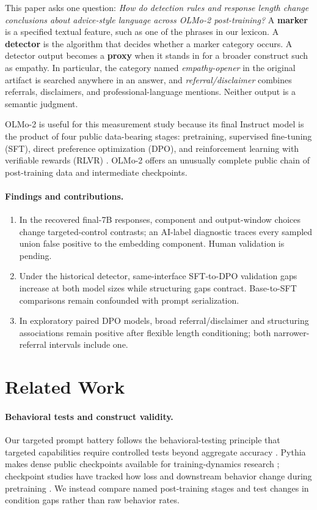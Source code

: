 \documentclass[11pt]{article}
\begin{document}
This paper asks one question: \emph{How do detection rules and response length
change conclusions about advice-style language across OLMo-2 post-training?}
A \textbf{marker} is a specified textual feature, such as one of the phrases in
our lexicon. A \textbf{detector} is the algorithm that decides whether a marker
category occurs. A detector output becomes a \textbf{proxy} when it stands in
for a broader construct such as empathy. In particular, the category named
\emph{empathy-opener} in the original artifact is searched anywhere in an
answer, and \emph{referral/disclaimer} combines referrals, disclaimers, and
professional-language mentions. Neither output is a semantic judgment.

OLMo-2 is useful for this measurement study because its final Instruct model is
the product of four public data-bearing stages:
pretraining, supervised fine-tuning (SFT), direct preference optimization
(DPO), and reinforcement learning with verifiable rewards (RLVR)
\citep{olmo2025olmo2}. OLMo-2 offers an unusually complete public chain of
post-training data and intermediate checkpoints.

\newpage
\paragraph{Findings and contributions.}
\begin{enumerate}\itemsep2pt
\item In the recovered final-7B responses, component and output-window choices
change targeted-control contrasts; an AI-label diagnostic traces every sampled
union false positive to the embedding component. Human validation is pending.
\item Under the historical detector, same-interface SFT-to-DPO validation gaps
increase at both model sizes while structuring gaps contract. Base-to-SFT
comparisons remain confounded with prompt serialization.
\item In exploratory paired DPO models, broad referral/disclaimer and
structuring associations remain positive after flexible length conditioning;
both narrower-referral intervals include one.
\end{enumerate}

\section{Related Work}

\paragraph{Behavioral tests and construct validity.}
Our targeted prompt battery follows the behavioral-testing principle that
targeted capabilities require controlled tests beyond aggregate accuracy
\citep{ribeiro2020checklist}. Pythia makes dense public checkpoints available
for training-dynamics research \citep{biderman2023pythia}; checkpoint studies
have tracked how loss and downstream behavior change during pretraining
\citep{xia2023trajectories}. We instead compare named post-training stages and
test changes in condition gaps rather than raw behavior rates.
\end{document}
